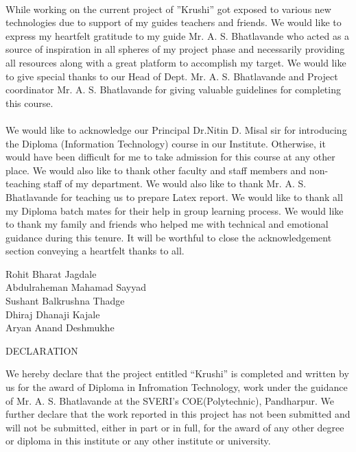 \documentclass[a4paper, 12pt, notitlepage]{report}
\begin{document}
\paragraph{} While working on the current project of ”Krushi” got exposed to various new technologies due to support of my guides teachers and friends. We would like to express my heartfelt gratitude to my guide Mr. A. S. Bhatlavande who acted as a source of inspiration in all spheres of my project phase and necessarily providing all resources along with a great platform to accomplish my target. We would like to give special thanks to our Head of Dept. Mr. A. S. Bhatlavande and Project coordinator Mr. A. S. Bhatlavande for giving valuable guidelines for completing this course.
\paragraph{} We would like to acknowledge our Principal Dr.Nitin D. Misal sir for introducing the Diploma (Information Technology) course in our Institute. Otherwise, it would have been difficult for me to take admission for this course at any other place. We would also like to thank other faculty and staff members and non-teaching staff of my department. We would also like to thank Mr. A. S. Bhatlavande for teaching us to prepare Latex report. We would like to thank all my Diploma batch mates for their help in group learning process. We would like to thank my family and friends who helped me with technical and emotional guidance during this tenure. It will be worthful to close the acknowledgement section conveying a heartfelt thanks to all.



\begin{flushright}
Rohit Bharat Jagdale\\
Abdulraheman Mahamad Sayyad\\
Sushant Balkrushna Thadge\\
Dhiraj Dhanaji Kajale\\
Aryan Anand Deshmukhe\\
\end{flushright}

\newpage

\begin{center}
{\LARGE DECLARATION}
\end{center}


We hereby declare that the project entitled “Krushi” is completed and written by us for the award of Diploma in  Infromation Technology, work under the guidance of Mr. A. S. Bhatlavande at the SVERI’s COE(Polytechnic), Pandharpur. We further declare that the work reported in this project has not been submitted and will not be submitted, either in part or in full, for the award of any other degree or diploma in this institute or any other institute or university.\newline
\end{document}
